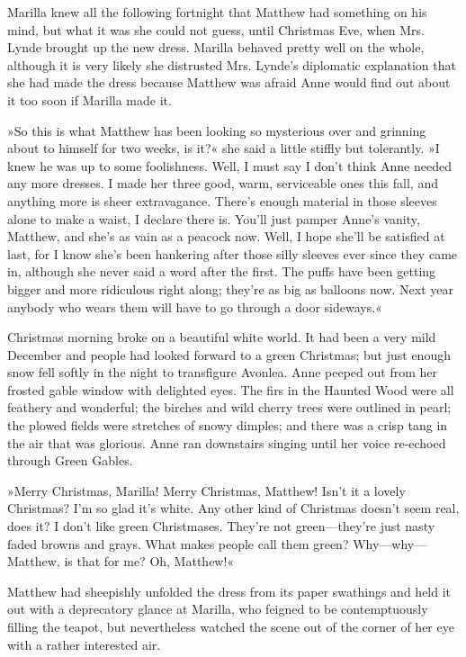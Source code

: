 Marilla knew all the following fortnight that Matthew had something on his mind, but what it was she could not guess, until Christmas Eve, when Mrs. Lynde brought up the new dress. Marilla behaved pretty well on the whole, although it is very likely she distrusted Mrs. Lynde’s diplomatic explanation that she had made the dress because Matthew was afraid Anne would find out about it too soon if Marilla made it.

»So this is what Matthew has been looking so mysterious over and grinning about to himself for two weeks, is it?« she said a little stiffly but tolerantly. »I knew he was up to some foolishness. Well, I must say I don’t think Anne needed any more dresses. I made her three good, warm, serviceable ones this fall, and anything more is sheer extravagance. There’s enough material in those sleeves alone to make a waist, I declare there is. You’ll just pamper Anne’s vanity, Matthew, and she’s as vain as a peacock now. Well, I hope she’ll be satisfied at last, for I know she’s been hankering after those silly sleeves ever since they came in, although she never said a word after the first. The puffs have been getting bigger and more ridiculous right along; they’re as big as balloons now. Next year anybody who wears them will have to go through a door sideways.«

Christmas morning broke on a beautiful white world. It had been a very mild December and people had looked forward to a green Christmas; but just enough snow fell softly in the night to transfigure Avonlea. Anne peeped out from her frosted gable window with delighted eyes. The firs in the Haunted Wood were all feathery and wonderful; the birches and wild cherry trees were outlined in pearl; the plowed fields were stretches of snowy dimples; and there was a crisp tang in the air that was glorious. Anne ran downstairs singing until her voice re-echoed through Green Gables.

»Merry Christmas, Marilla! Merry Christmas, Matthew! Isn’t it a lovely Christmas? I’m so glad it’s white. Any other kind of Christmas doesn’t seem real, does it? I don’t like green Christmases. They’re not green—they’re just nasty faded browns and grays. What makes people call them green? Why—why—Matthew, is that for me? Oh, Matthew!«

Matthew had sheepishly unfolded the dress from its paper swathings and held it out with a deprecatory glance at Marilla, who feigned to be contemptuously filling the teapot, but nevertheless watched the scene out of the corner of her eye with a rather interested air.


